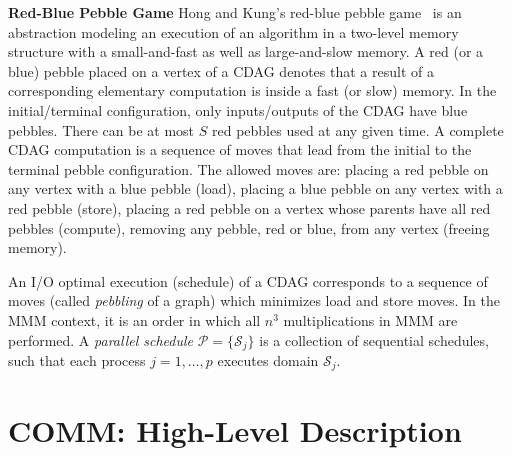 \documentclass[sigplan,review,anonymous,10pt]{acmart}\settopmatter{printfolios=true,printccs=false,printacmref=false}
\newcommand\greg[1]{\textcolor{blue}{[Greg: #1]}}
\newcommand\mac[1]{\textcolor{red}{[Mac: #1]}}
\newcommand{\macb}[1]{\textbf{\textsf{#1}}}
\begin{document}
\macb{Red-Blue Pebble Game} Hong and Kung's red-blue pebble game~\cite{redblue} 
is an abstraction modeling
an execution of an algorithm in a two-level memory structure with a
small-and-fast as well as large-and-slow memory. A red (or a blue) pebble
placed on a vertex of a CDAG denotes that a result of a corresponding 
elementary computation is inside
a fast (or slow) memory. 
In the initial/terminal configuration, only inputs/outputs of the CDAG have
blue pebbles.
%
There can be at most $S$ red pebbles used at any given time. A complete 
CDAG computation is a
sequence of moves that lead from the initial to the terminal pebble
configuration.
%
The allowed moves are:  placing a red pebble on any
vertex with a blue pebble (load),  placing a blue pebble on any
vertex with a red pebble (store),  placing a red pebble on a vertex
whose parents have all red pebbles (compute), removing any pebble, 
red or blue, from any vertex (freeing memory).

An I/O optimal execution (schedule) of a CDAG corresponds to a sequence of 
moves (called 
\emph{pebbling} of a graph) which minimizes load and store moves.
%
In the MMM context, it is an order in which all $n^3$
multiplications in MMM are performed. A \emph{parallel schedule} $\mathcal{P} = 
\{\mathcal{S}_j\}$ is a collection of sequential schedules, such that each 
process $j = 1, \dots, p$ executes domain $\mathcal{S}_j$.

\section{COMM: High-Level Description}
\label{sec:commDescr}
%
\end{document}

